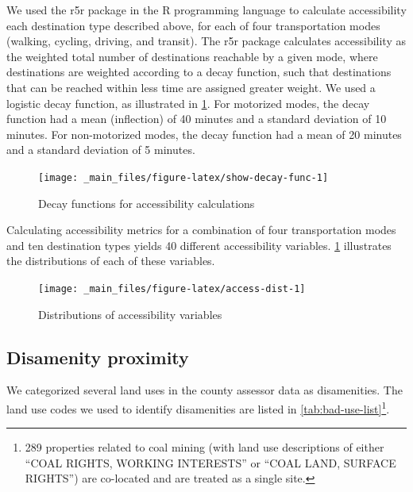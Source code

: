\documentclass[
]{book}
\begin{document}
We used the r5r package in the R programming language \citep{pereira_r5r_2021} to
calculate accessibility each destination type described above,
for each of four transportation modes (walking, cycling, driving, and transit).
The r5r package calculates accessibility as the weighted total number of
destinations reachable by a given mode, where destinations are weighted
according to a decay function, such that destinations that can be reached within
less time are assigned greater weight. We used a logistic decay function, as
illustrated in \ref{fig:show-decay-func}. For motorized modes, the decay
function had a mean (inflection) of 40 minutes and a standard deviation of 10
minutes. For non-motorized modes, the decay function had a mean of 20 minutes
and a standard deviation of 5 minutes.

\begin{figure}

{\centering \texttt{[image: \_main\_files/figure-latex/show-decay-func-1]} 

}

\caption{Decay functions for accessibility calculations}\label{fig:show-decay-func}
\end{figure}

Calculating accessibility metrics for a combination of four transportation
modes and ten destination types yields 40 different accessibility variables. \ref{fig:show-decay-func}
illustrates the distributions of each of these variables.

\begin{figure}

{\centering \texttt{[image: \_main\_files/figure-latex/access-dist-1]} 

}

\caption{Distributions of accessibility variables}\label{fig:access-dist}
\end{figure}

\hypertarget{disamenity-proximity}{%
\subsection{Disamenity proximity}\label{disamenity-proximity}}

We categorized several land uses in the county assessor data as
disamenities. The land use codes we used to identify disamenities are
listed in \ref{tab:bad-use-list}\footnote{289 properties related to coal mining
  (with land use descriptions of either ``COAL RIGHTS, WORKING INTERESTS'' or
  ``COAL LAND, SURFACE RIGHTS'') are co-located and are treated as a single
  site.}.
\end{document}
